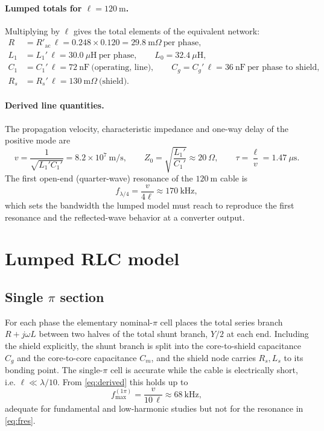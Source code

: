 \documentclass[11pt,a4paper]{article}
\begin{document}
\paragraph{Lumped totals for $\ell=120\ \mathrm{m}$.}
Multiplying by $\ell$ gives the total elements of the equivalent network:
\begin{align*}
R &= R'_{\mathrm{ac}}\,\ell = 0.248\times0.120 = 29.8\ \mathrm{m}\Omega \ \text{per phase},\\
L_1 &= L_1'\,\ell = 30.0\ \mu\mathrm{H} \ \text{per phase},\qquad
L_0 = 32.4\ \mu\mathrm{H},\\
C_1 &= C_1'\,\ell = 72\ \mathrm{nF} \ \text{(operating, line)},\qquad
C_g = C_g'\,\ell = 36\ \mathrm{nF} \ \text{per phase to shield},\\
R_s &= R_s'\,\ell = 130\ \mathrm{m}\Omega \ \text{(shield)}.
\end{align*}

\paragraph{Derived line quantities.}
The propagation velocity, characteristic impedance and one-way delay of the
positive mode are
\begin{equation}
v=\frac{1}{\sqrt{L_1'C_1'}}=8.2\times10^{7}\ \mathrm{m/s},
\qquad
Z_0=\sqrt{\frac{L_1'}{C_1'}}\approx20\ \Omega,
\qquad
\tau=\frac{\ell}{v}=1.47\ \mu\mathrm{s}.
\label{eq:derived}
\end{equation}
The first open-end (quarter-wave) resonance of the $120\ \mathrm{m}$ cable is
\begin{equation}
f_{\lambda/4}=\frac{v}{4\ell}\approx170\ \mathrm{kHz},
\label{eq:fres}
\end{equation}
which sets the bandwidth the lumped model must reach to reproduce the first
resonance and the reflected-wave behavior at a converter output.

\section{Lumped RLC model}\label{sec:lumped}

\subsection{Single $\pi$ section}
For each phase the elementary nominal-$\pi$ cell places the total series branch
$R+j\omega L$ between two halves of the total shunt branch, $Y/2$ at each end.
Including the shield explicitly, the shunt branch is split into the core-to-shield
capacitance $C_g$ and the core-to-core capacitance $C_m$, and the shield node
carries $R_s,L_s$ to its bonding point. The single-$\pi$ cell is accurate while the
cable is electrically short, i.e. $\ell \ll \lambda/10$. From \eqref{eq:derived}
this holds up to
\begin{equation}
f_{\max}^{(1\pi)}=\frac{v}{10\,\ell}\approx 68\ \mathrm{kHz},
\end{equation}
adequate for fundamental and low-harmonic studies but not for the resonance in
\eqref{eq:fres}.
\end{document}
